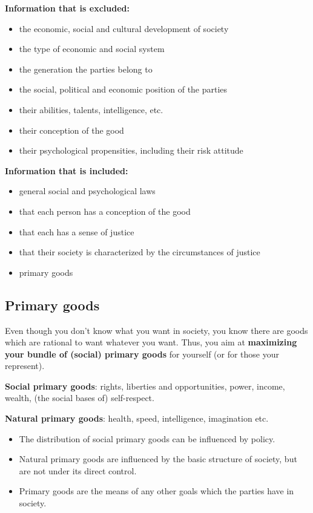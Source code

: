 \textbf{Information that is excluded:}

\begin{itemize}
	\item the economic, social and cultural development of society
	\item the type of economic and social system
	\item the generation the parties belong to
	\item the social, political and economic position of the parties
	\item their abilities, talents, intelligence, etc.
	\item their conception of the good
	\item their psychological propensities, including their risk attitude
\end{itemize}

\textbf{Information that is included:}

\begin{itemize}
	\item general social and psychological laws
	\item that each person has a conception of the good
	\item that each has a sense of justice
	\item that their society is characterized by the circumstances of
	justice
	\item primary goods
\end{itemize}

\subsection{Primary goods}

Even though you don't know what you want in society, you know there are goods
which are rational to want whatever you want. Thus, you aim at \textbf{
maximizing your bundle of (social) primary goods} for yourself (or for those
your represent).

\textbf{Social primary goods}: rights, liberties and opportunities, power,
income, wealth, (the social bases of) self-respect.

\textbf{Natural primary goods}: health, speed, intelligence, imagination etc.

\begin{itemize}
	\item The distribution of social primary goods can be influenced by
	policy.
	\item Natural primary goods are influenced by the basic structure of
	society, but are not under its direct control.
	\item Primary goods are the means of any other goals which the parties
	have in society.
\end{itemize}

